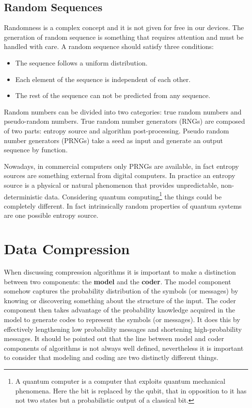 \documentclass[12pt, a4paper]{report}
\begin{document}
\section{Random Sequences}

Randomness is a complex concept and it is not given for free in our devices.
The generation of random sequence is something that requires attention and must be handled with care.
A random sequence should satisfy three conditions:

\begin{itemize}
  \item The sequence follows a uniform distribution.
  \item Each element of the sequence is independent of each other.
  \item The rest of the sequence can not be predicted from any sequence.
\end{itemize}

Random numbers can be divided into two categories: true random numbers and pseudo-random numbers.
True random number generators (RNGs) are composed of two parts: entropy source and algorithm post-processing.
Pseudo random number generators (PRNGs) take a seed as input and generate an output sequence by function.

Nowadays, in commercial computers only PRNGs are available, in fact entropy sources are something external from digital computers.
In practice an entropy source is a physical or natural phenomenon that provides unpredictable, non-deterministic data.
Considering quantum computing\footnote{A quantum computer is a computer that exploits quantum mechanical phenomena. Here the bit
is replaced by the qubit, that in opposition to it has not two states but a probabilistic output of a classical bit.} the things
could be completely different.
In fact intrinsically random properties of quantum systems are one possible entropy source.

\chapter{Data Compression}

When discussing compression algorithms it is important to make a distinction between two components: the \textbf{model} and the
\textbf{coder}.
The model component somehow captures the probability distribution of the symbols (or messages) by knowing or discovering something
about the structure of the input.
The coder component then takes advantage of the probability knowledge acquired in the model to generate codes to represent the
symbols (or messages).
It does this by effectively lengthening low probability messages and shortening high-probability messages.
It should be pointed out that the line between model and coder components of algorithms is not always well defined, nevertheless
it is important to consider that modeling and coding are two distinctly different things.
\end{document}
